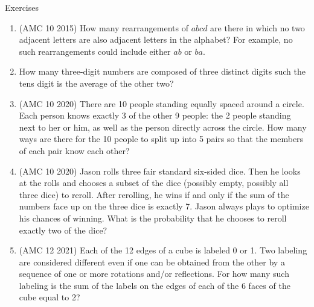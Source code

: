 \begin{xcb}{Exercises}
\begin{enumerate}
\item(AMC 10 2015)  How many rearrangements of $abcd$ are there in which no two adjacent letters are also adjacent letters in the alphabet? For example, no such rearrangements could include either $ab$ or $ba$.
\begin{hint}
\end{hint}
\item {} How many three-digit numbers are composed of three distinct digits such the tens digit is the average of the other two?
\begin{hint}
\end{hint}
\item (AMC 10 2020)  There are 10 people standing equally spaced around a circle. Each person knows exactly 3 of the other 9 people: the 2 people standing next to her or him, as well as the person directly across the circle. How many ways are there for the 10 people to split up into 5 pairs so that the members of each pair know each other?
\begin{hint}
\end{hint}
\item (AMC 10 2020)  Jason rolls three fair standard six-sided dice. Then he looks at the rolls and chooses a subset of the dice (possibly empty, possibly all three dice) to reroll. After rerolling, he wins if and only if the sum of the numbers face up on the three dice is exactly 7. Jason always plays to optimize his chances of winning. What is the probability that he chooses to reroll exactly two of the dice?
\begin{hint}
\end{hint}
\item(AMC 12 2021)  Each of the 12 edges of a cube is labeled 0 or 1. Two labeling are considered different even if one can be obtained from the other by a sequence of one or more rotations and/or reflections. For how many such labeling is the sum of the labels on the edges of each of the 6 faces of the cube equal to 2?
\begin{hint}

\end{hint}
\end{enumerate}
\end{xcb}
